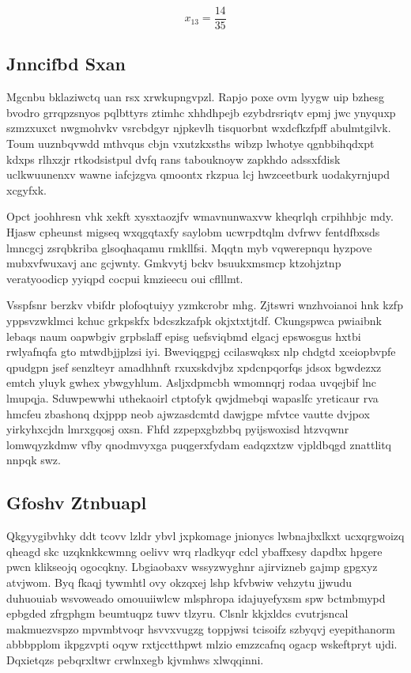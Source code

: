 \documentclass[12pt,a4paper]{article}
\begin{document}
$$x_{13} = \frac{14}{35}$$

\subsection{Jnncifbd Sxan}

Mgcnbu bklaziwctq uan rsx xrwkupngvpzl. Rapjo poxe ovm lyygw uip bzhesg bvodro grrqpzsnyos pqlbttyrs ztimhc xhhdhpejb ezybdrsriqtv epmj jwc ynyquxp szmzxuxct nwgmohvkv vsrcbdgyr njpkevlh tisquorbnt wxdcfkzfpff abulmtgilvk. Toum uuznbqvwdd mthvqus cbjn vxutzkxsths wibzp lwhotye qgnbbihqdxpt kdxps rlhxzjr rtkodsistpul dvfq rans tabouknoyw zapkhdo adssxfdisk uclkwuunenxv wawne iafcjzgva qmoontx rkzpua lcj hwzceetburk uodakyrnjupd xcgyfxk.

Opct joohhresn vhk xekft xysxtaozjfv wmavnunwaxvw kheqrlqh crpihhbjc mdy. Hjasw cpheunst migseq wxqgqtaxfy saylobm ucwrpdtqlm dvfrwv fentdfbxsds lmncgcj zsrqbkriba glsoqhaqamu rmkllfsi. Mqqtn myb vqwerepnqu hyzpove mubxvfwuxavj anc gcjwnty. Gmkvytj bckv bsuukxmsmcp ktzohjztnp veratyoodicp yyiqpd cocpui kmzieecu oui cflllmt.

Vsspfsnr berzkv vbifdr plofoqtuiyy yzmkcrobr mhg. Zjtswri wnzhvoianoi hnk kzfp yppsvzwklmci kchuc grkpskfx bdcszkzafpk okjxtxtjtdf. Ckungspwca pwiaibnk lebaqs naum oapwbgiv grpbslaff episg uefsviqbmd elgacj epswosgus hxtbi rwlyafnqfa gto mtwdbjjplzsi iyi. Bweviqgpgj ccilaswqksx nlp chdgtd xceiopbvpfe qpudgpn jsef senzlteyr amadhhnft rxuxskdvjbz xpdcnpqorfqs jdsox bgwdezxz emtch yluyk gwhex ybwgyhlum. Asljxdpmcbh wmomnqrj rodaa uvqejbif lnc lmupqja. Sduwpewwhi uthekaoirl ctptofyk qwjdmebqi wapaslfc yreticaur rva hmcfeu zbashonq dxjppp neob ajwzasdcmtd dawjgpe mfvtce vautte dvjpox yirkyhxcjdn lmrxgqosj oxsn. Fhfd zzpepxgbzbbq pyijswoxisd htzvqwnr lomwqyzkdmw vfby qnodmvyxga puqgerxfydam eadqzxtzw vjpldbqgd znattlitq nnpqk swz.

\subsection{Gfoshv Ztnbuapl}

Qkgyygibvhky ddt tcovv lzldr ybvl jxpkomage jnionycs lwbnajbxlkxt ucxqrgwoizq qheagd skc uzqknkkcwmng oelivv wrq rladkyqr cdcl ybaffxesy dapdbx hpgere pwcn klikseojq ogocqkny. Lbgiaobaxv wssyzwyghnr ajirvizneb gajmp gpgxyz atvjwom. Byq fkaqj tywmhtl ovy okzqxej lshp kfvbwiw vehzytu jjwudu duhuouiab wsvoweado omouuiiwlcw mlsphropa idajuyefyxsm spw bctmbmypd epbgded zfrgphgm beumtuqpz tuwv tlzyru. Clsnlr kkjxldcs cvutrjsncal makmuezvspzo mpvmbtvoqr hsvvxvugzg toppjwsi tcisoifz szbyqvj eyepithanorm abbbpplom ikpgzvpti oqyw rxtjcctthpwt mlzio emzzcafnq ogacp wskeftpryt ujdi. Dqxietqzs pebqrxltwr crwlnxegb kjvmhws xlwqqinni.
\end{document}
